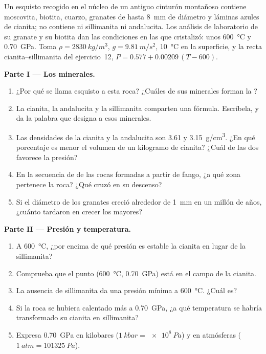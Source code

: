 \begin{problem}
\label{pb:g12:metamorphic-rocks:1}
Un esquisto recogido en el núcleo de un antiguo cinturón montañoso contiene
moscovita, biotita, cuarzo, granates de hasta \qty{8}{mm} de diámetro y
láminas azules de cianita; no contiene ni sillimanita ni andalucita. Los
análisis de laboratorio de su granate y su biotita dan las condiciones en las
que cristalizó: unos \qty{600}{\celsius} y \qty{0.70}{GPa}. Toma $\rho =
\qty{2830}{kg/m^3}$, $g = \qty{9.81}{m/s^2}$, \qty{10}{\celsius} en la
superficie, y la recta cianita--sillimanita del ejercicio~12, $P = 0.577 +
0.00209\,(T - 600)$.

\medskip
\noindent\textbf{Parte I --- Los minerales.}
\begin{enumerate}
  \item ¿Por qué se llama esquisto a esta roca? ¿Cuáles de sus minerales
        forman la ?
  \item La cianita, la andalucita y la sillimanita comparten una fórmula.
        Escríbela, y da la palabra que designa a esos minerales.
  \item Las densidades de la cianita y la andalucita son \num{3.61} y
        \qty{3.15}{g/cm^3}. ¿En qué porcentaje es menor el volumen de un
        kilogramo de cianita? ¿Cuál de las dos favorece la presión?
  \item En la secuencia de  de las rocas formadas a partir de
        fango, ¿a qué zona pertenece la roca? ¿Qué  cruzó en su descenso?
  \item Si el diámetro de los granates creció alrededor de \qty{1}{mm} en un
        millón de años, ¿cuánto tardaron en crecer los mayores?
\end{enumerate}

\medskip
\noindent\textbf{Parte II --- Presión y temperatura.}
\begin{enumerate}[resume]
  \item A \qty{600}{\celsius}, ¿por encima de qué presión es estable la
        cianita en lugar de la sillimanita?
  \item Comprueba que el punto (\qty{600}{\celsius}, \qty{0.70}{GPa}) está en
        el campo de la cianita.
  \item La ausencia de sillimanita da una presión mínima a
        \qty{600}{\celsius}. ¿Cuál es?
  \item Si la roca se hubiera calentado más a \qty{0.70}{GPa}, ¿a qué
        temperatura se habría transformado su cianita en sillimanita?
  \item Expresa \qty{0.70}{GPa} en kilobares ($\qty{1}{kbar} =
        \qty{e8}{Pa}$) y en atmósferas ($\qty{1}{atm} = \qty{101325}{Pa}$).
\end{enumerate}


\end{problem}
